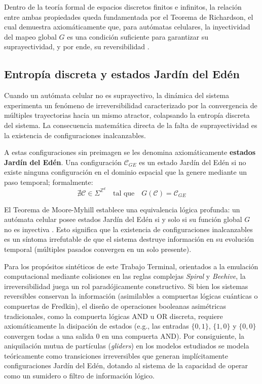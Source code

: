 Dentro de la teoría formal de espacios discretos finitos e infinitos, la relación entre ambas propiedades queda fundamentada por el Teorema de Richardson, el cual demuestra axiomáticamente que, para autómatas celulares, la inyectividad del mapeo global $G$ es una condición suficiente para garantizar su suprayectividad, y por ende, su reversibilidad \cite{Kari2005}.

\subsection{Entropía discreta y estados Jardín del Edén}

Cuando un autómata celular no es suprayectivo, la dinámica del sistema experimenta un fenómeno de irreversibilidad caracterizado por la convergencia de múltiples trayectorias hacia un mismo atractor, colapsando la entropía discreta del sistema. La consecuencia matemática directa de la falta de suprayectividad es la existencia de configuraciones inalcanzables.

A estas configuraciones sin preimagen se les denomina axiomáticamente \textbf{estados Jardín del Edén}. Una configuración $\mathcal{C}_{GE}$ es un estado Jardín del Edén si no existe ninguna configuración en el dominio espacial que la genere mediante un paso temporal; formalmente:
\begin{equation}
    \nexists \mathcal{C} \in \Sigma^{\mathbb{Z}^d} \quad \text{tal que} \quad G(\mathcal{C}) = \mathcal{C}_{GE}
\end{equation}

El Teorema de Moore-Myhill establece una equivalencia lógica profunda: un autómata celular posee estados Jardín del Edén si y solo si su función global $G$ no es inyectiva \cite{Wuensche1998}. Esto significa que la existencia de configuraciones inalcanzables es un síntoma irrefutable de que el sistema destruye información en su evolución temporal (múltiples pasados convergen en un solo presente).

Para los propósitos sintéticos de este Trabajo Terminal, orientados a la emulación computacional mediante colisiones en las reglas complejas \textit{Spiral} y \textit{Beehive}, la irreversibilidad juega un rol paradójicamente constructivo. Si bien los sistemas reversibles conservan la información (asimilables a compuertas lógicas cuánticas o compuertas de Fredkin), el diseño de operaciones booleanas asimétricas tradicionales, como la compuerta lógicas AND u OR discreta, requiere axiomáticamente la disipación de estados (e.g., las entradas $\{0,1\}$, $\{1,0\}$ y $\{0,0\}$ convergen todas a una salida $0$ en una compuerta AND). Por consiguiente, la aniquilación mutua de partículas (\textit{gliders}) en los modelos estudiados se modela teóricamente como transiciones irreversibles que generan implícitamente configuraciones Jardín del Edén, dotando al sistema de la capacidad de operar como un sumidero o filtro de información lógico.

